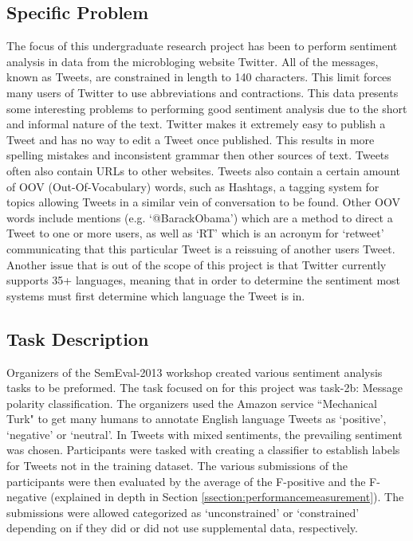 \documentclass[final,3p,12pt]{elsarticle}
\begin{document}
\subsection{Specific Problem}
\label{ssection:specificproblem}

The focus of this undergraduate research project has been to perform sentiment
analysis in data from the microbloging website Twitter. All of the messages,
known as Tweets, are constrained in length to 140 characters. This limit forces
many users of Twitter to use abbreviations and contractions. This data presents
some interesting problems to performing good sentiment analysis due to the
short and informal nature of the text. Twitter makes it extremely easy to
publish a Tweet and has no way to edit a Tweet once published. This results in
more spelling mistakes and inconsistent grammar then other sources of text.
Tweets often also contain URLs to other websites. Tweets also contain a certain
amount of OOV (Out-Of-Vocabulary) words, such as Hashtags, a tagging system for
topics allowing Tweets in a similar vein of conversation to be found. Other OOV
words include mentions (e.g. `@BarackObama') which are a method to direct a
Tweet to one or more users, as well as `RT' which is an acronym for `retweet'
communicating that this particular Tweet is a reissuing of another users Tweet.
Another issue that is out of the scope of this project is that Twitter
currently supports 35+ languages, meaning that in order to determine the
sentiment most systems must first determine which language the Tweet is in.

\subsection{Task Description}
\label{ssection:taskdescription}

Organizers of the SemEval-2013 workshop created various sentiment analysis
tasks to be preformed. The task focused on for this project was task-2b:
Message polarity classification. The organizers used the Amazon service
``Mechanical Turk" to get many humans to annotate English language Tweets as
`positive', `negative' or `neutral'. In Tweets with mixed sentiments, the
prevailing sentiment was chosen. Participants were tasked with creating a
classifier to establish labels for Tweets not in the training dataset. The
various submissions of the participants were then evaluated by the average of
the F-positive and the F-negative (explained in depth in Section
\ref{ssection:performancemeasurement}). The submissions were allowed
categorized as `unconstrained' or `constrained' depending on if they did or did
not use supplemental data, respectively.
\end{document}
